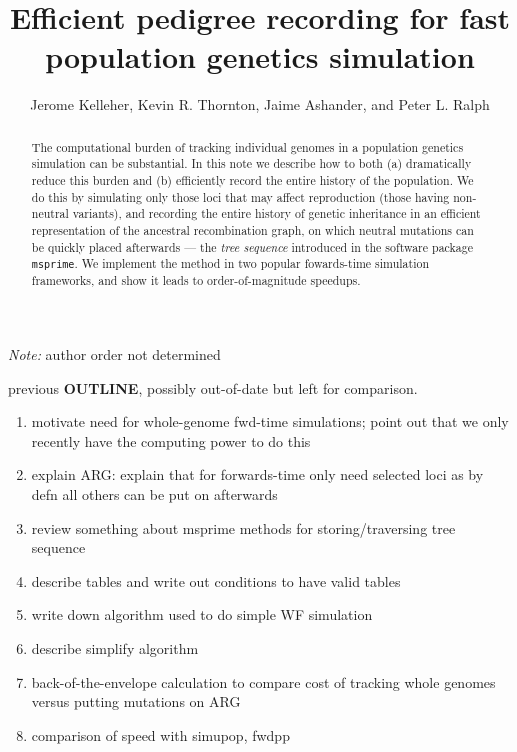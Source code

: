 \documentclass{article}
\newcommand{\msprime}{\texttt{msprime}}
\begin{document}
\title{Efficient pedigree recording for fast population genetics simulation}
\author{Jerome Kelleher,
        Kevin R. Thornton,
        Jaime Ashander, and
        Peter L. Ralph}
\maketitle

\emph{Note:} author order not determined


\begin{abstract}
    The computational burden of tracking individual genomes 
    in a population genetics simulation can be substantial.
    In this note we describe how to both (a) dramatically reduce this burden and
    (b) efficiently record the entire history of the population.
    We do this by simulating only those loci that may affect reproduction (those having non-neutral variants),
    and recording the entire history of genetic inheritance in an efficient representation of the ancestral recombination graph,
    on which neutral mutations can be quickly placed afterwards ---
    the \emph{tree sequence} introduced in the software package \msprime.
    We implement the method in two popular fowards-time simulation frameworks,
    and show it leads to order-of-magnitude speedups.
\end{abstract}


previous \textbf{OUTLINE}, possibly out-of-date but left for comparison.
\begin{enumerate}
    \item motivate need for whole-genome fwd-time simulations; point out that we only recently have the computing power to do this
    \item explain ARG: explain that for forwards-time only need selected loci as by defn all others can be put on afterwards
    \item review something about msprime methods for storing/traversing tree sequence
    \item describe tables and write out conditions to have valid tables
    \item write down algorithm used to do simple WF simulation
    \item describe simplify algorithm
    \item back-of-the-envelope calculation to compare cost of tracking whole genomes versus putting mutations on ARG
    \item comparison of speed with simupop, fwdpp
\end{enumerate}
\end{document}
